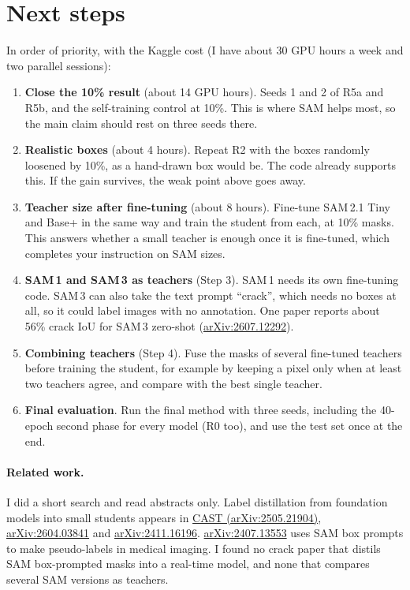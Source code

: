 \documentclass[11pt,a4paper]{article}
\begin{document}
\section{Next steps}
In order of priority, with the Kaggle cost (I have about 30 GPU hours a week and two parallel sessions):
\begin{enumerate}
\item \textbf{Close the 10\% result} (about 14 GPU hours). Seeds 1 and 2 of R5a and R5b, and the self-training control at 10\%.
This is where SAM helps most, so the main claim should rest on three seeds there.
\item \textbf{Realistic boxes} (about 4 hours). Repeat R2 with the boxes randomly loosened by 10\%, as a hand-drawn box would be.
The code already supports this. If the gain survives, the weak point above goes away.
\item \textbf{Teacher size after fine-tuning} (about 8 hours). Fine-tune SAM\,2.1 Tiny and Base+ in the same way and train the student from each,
at 10\% masks. This answers whether a small teacher is enough once it is fine-tuned, which completes your instruction on SAM sizes.
\item \textbf{SAM\,1 and SAM\,3 as teachers} (Step 3). SAM\,1 needs its own fine-tuning code. SAM\,3 can also take the text prompt ``crack'',
which needs no boxes at all, so it could label images with no annotation. One paper reports about 56\% crack IoU for SAM\,3 zero-shot
(\href{https://arxiv.org/abs/2607.12292}{arXiv:2607.12292}).
\item \textbf{Combining teachers} (Step 4). Fuse the masks of several fine-tuned teachers before training the student, for example by keeping
a pixel only when at least two teachers agree, and compare with the best single teacher.
\item \textbf{Final evaluation}. Run the final method with three seeds, including the 40-epoch second phase for every model (R0 too),
and use the test set once at the end.
\end{enumerate}

\sloppy\paragraph{Related work.} I did a short search and read abstracts only.
Label distillation from foundation models into small students appears in \href{https://arxiv.org/abs/2505.21904}{CAST (arXiv:2505.21904)},
\href{https://arxiv.org/abs/2604.03841}{arXiv:2604.03841} and \href{https://arxiv.org/abs/2411.16196}{arXiv:2411.16196}.
\href{https://arxiv.org/abs/2407.13553}{arXiv:2407.13553} uses SAM box prompts to make pseudo-labels in medical imaging.
I found no crack paper that distils SAM box-prompted masks into a real-time model, and none that compares several SAM versions as teachers.
\end{document}
